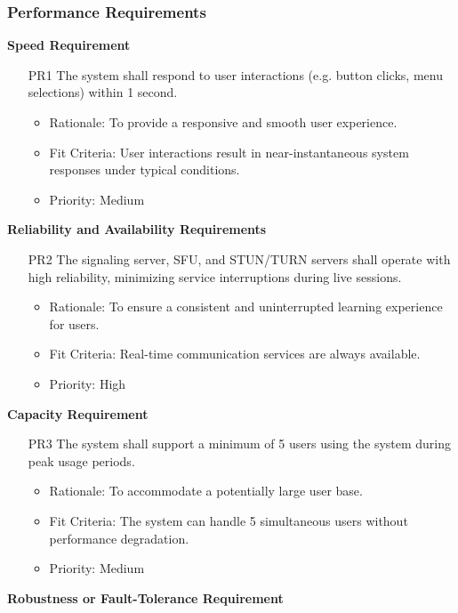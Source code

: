 \documentclass[12pt]{article}
\begin{document}
\subsubsection{Performance Requirements}
\textbf{Speed Requirement}
\begin{itemize}
    \item[PR1] The system shall respond to user interactions (e.g. button clicks, menu selections) within 1 second. \label{PR1}
    \begin{itemize}
        \item Rationale: To provide a responsive and smooth user experience.
        \item Fit Criteria: User interactions result in near-instantaneous system responses under typical conditions.
        \item Priority: Medium
    \end{itemize}
\end{itemize}
\textbf{Reliability and Availability Requirements}
\begin{itemize}
    \item[PR2] The signaling server, SFU, and STUN/TURN servers shall operate with high reliability, minimizing service interruptions during live sessions. \label{PR2}
    \begin{itemize}
        \item Rationale: To ensure a consistent and uninterrupted learning experience for users.
        \item Fit Criteria: Real-time communication services are always available.
        \item Priority: High
    \end{itemize}
\end{itemize}
\textbf{Capacity Requirement}
\begin{itemize}
    \item[PR3] The system shall support a minimum of 5 users using the system during peak usage periods. \label{PR3}
    \begin{itemize}
        \item Rationale: To accommodate a potentially large user base.
        \item Fit Criteria: The system can handle 5 simultaneous users without performance degradation.
        \item Priority: Medium
    \end{itemize}
\end{itemize}
\textbf{Robustness or Fault-Tolerance Requirement}
\end{document}

